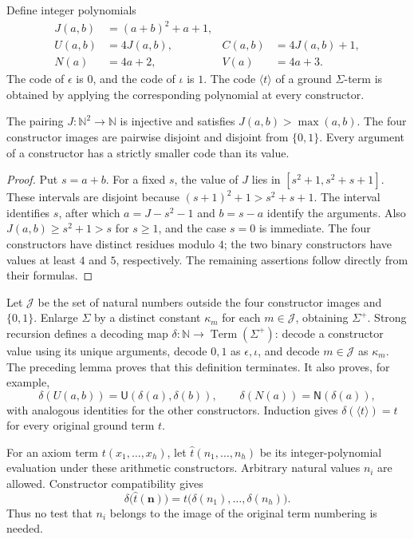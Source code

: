\documentclass[11pt,a4paper]{article}
\theoremstyle{definition}
\begin{document}
Define integer polynomials
\begin{align}
 J(a,b)&=(a+b)^2+a+1,\\
 U(a,b)&=4J(a,b),& C(a,b)&=4J(a,b)+1,\\
 N(a)&=4a+2,& V(a)&=4a+3.
\end{align}
The code of $\epsilon$ is $0$, and the code of $\iota$ is $1$.
The code $\langle t\rangle$ of a ground $\Sigma$-term is obtained by
applying the corresponding polynomial at every constructor.

\begin{auxsyntaxlem}
The pairing $J:\mathbb N^2\to\mathbb N$ is injective and satisfies
$J(a,b)>\max(a,b)$.  The four constructor images are pairwise disjoint
and disjoint from $\{0,1\}$.  Every argument of a constructor has a
strictly smaller code than its value.
\end{auxsyntaxlem}
\begin{proof}
Put $s=a+b$.  For a fixed $s$, the value of $J$ lies in
$[s^2+1,s^2+s+1]$.  These intervals are disjoint because
$(s+1)^2+1>s^2+s+1$.  The interval identifies $s$, after which
$a=J-s^2-1$ and $b=s-a$ identify the arguments.  Also
$J(a,b)\ge s^2+1>s$ for $s\ge1$, and the case $s=0$ is immediate.
The four constructors have distinct residues modulo $4$; the two binary
constructors have values at least $4$ and $5$, respectively.  The
remaining assertions follow directly from their formulas.
\end{proof}

Let $\mathcal J$ be the set of natural numbers outside the four
constructor images and $\{0,1\}$.  Enlarge $\Sigma$ by a distinct constant
$\kappa_m$ for each $m\in\mathcal J$, obtaining $\Sigma^+$.  Strong
recursion defines a decoding map
$\delta:\mathbb N\to\operatorname{Term}(\Sigma^+)$: decode a constructor
value using its unique arguments, decode $0,1$ as $\epsilon,\iota$, and
decode $m\in\mathcal J$ as $\kappa_m$.  The preceding lemma proves that
this definition terminates.  It also proves, for example,
\[
 \delta(U(a,b))=\mathsf U(\delta(a),\delta(b)),
 \qquad \delta(N(a))=\mathsf N(\delta(a)),
\]
with analogous identities for the other constructors.  Induction gives
$\delta(\langle t\rangle)=t$ for every original ground term $t$.

For an axiom term $t(x_1,\ldots,x_h)$, let
$\widehat t(n_1,\ldots,n_h)$ be its integer-polynomial evaluation under
these arithmetic constructors.  Arbitrary natural values $n_i$ are
allowed.  Constructor compatibility gives
\[
 \delta\bigl(\widehat t(\boldsymbol n)\bigr)
   =t\bigl(\delta(n_1),\ldots,\delta(n_h)\bigr).
\]
Thus no test that $n_i$ belongs to the image of the original term
numbering is needed.
\end{document}
